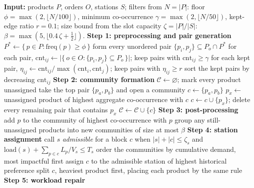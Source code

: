 \documentclass[11pt]{article}
\begin{document}
\begin{algorithm}[H]
\caption{Greedy product clustering and station assignment}
\label{alg:heuristic}
\begin{algorithmic}[1]
\State \textbf{Input:} products $P$, orders $O$, stations $S$; filters from $N=|P|$: floor $\phi=\max(2,\lfloor N/100\rfloor)$, minimum co-occurrence $\gamma=\max(2,\lfloor N/50\rfloor)$, kept-edge ratio $r=0.1$; size bound from the slot capacity $\zeta=|P|/|S|$: $\beta=\max(5,\lfloor 0.4\,\zeta+\tfrac12\rfloor)$.
\Statex
\State \textbf{Step 1: preprocessing and pair generation}
\State $P^{\ast}\gets\{\,p\in P:\mathrm{freq}(p)\ge\phi\,\}$
  \State form every unordered pair $\{p_i,p_j\}\subseteq P_o\cap P^{\ast}$
\EndFor
\State for each pair, $\mathrm{cnt}_{ij}\gets\lvert\{\,o\in O:\{p_i,p_j\}\subseteq P_o\,\}\rvert$; keep pairs with $\mathrm{cnt}_{ij}\ge\gamma$
\State for each kept pair, $\eta_{ij}\gets\mathrm{cnt}_{ij}/\max(\mathrm{cnt}_i,\mathrm{cnt}_j)$; keep pairs with $\eta_{ij}\ge r$
\State sort the kept pairs by decreasing $\mathrm{cnt}_{ij}$
\Statex
\State \textbf{Step 2: community formation}
\State $\mathcal{C}\gets\varnothing$; mark every product unassigned
  \State take the top pair $\{p_a,p_b\}$ and open a community $c\gets\{p_a,p_b\}$
    \State $p_x\gets$ unassigned product of highest aggregate co-occurrence with $c$
    \State $c\gets c\cup\{p_x\}$; delete every remaining pair that contains $p_x$
  \EndWhile
  \State $\mathcal{C}\gets\mathcal{C}\cup\{c\}$
\EndWhile
\Statex
\State \textbf{Step 3: post-processing}
    \State add $p$ to the community of highest co-occurrence with $p$
  \EndIf
\EndFor
\State group any still-unassigned products into new communities of size at most $\beta$
\Statex
\State \textbf{Step 4: station assignment}
\State call $s$ \emph{admissible} for a block $c$ when $|s|+|c|\le\zeta_s$ and $\mathrm{load}(s)+\sum_{p\in c}L_p/V_s\le T_s$
\State order the communities by cumulative demand, most impactful first
    \State assign $c$ to the admissible station of highest historical preference
    \State {}
  \Else
    \State split $c$, heaviest product first, placing each product by the same rule
  \EndIf
\EndFor
\Statex
\State \textbf{Step 5: workload repair} 

\end{algorithmic}
\end{algorithm}
\end{document}
